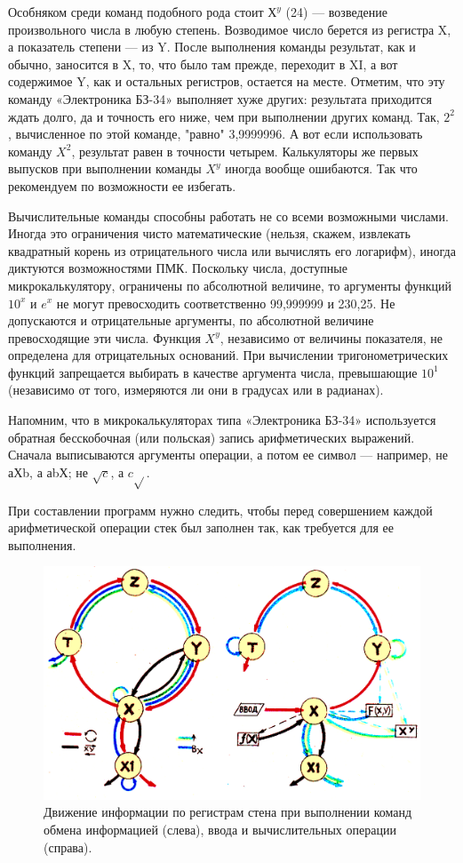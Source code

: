 \documentclass[11pt,a4paper,oneside]{article}
\begin{document}
Особняком среди команд подобного рода стоит $Х^{y}$ (24) — возведение произвольного числа в любую степень. Возводимое число берется из регистра X, а показатель степени — из Y. После выполнения команды результат, как и обычно, заносится в X, то, что было там прежде, переходит в XI, а вот содержимое Y, как и остальных регистров, остается на месте. Отметим, что эту команду «Электроника БЗ-34» выполняет хуже других: результата приходится ждать долго, да и точность его ниже, чем при выполнении других команд. Так, $2^{2}$, вычисленное по этой команде, "равно" 3,9999996. А вот если использовать команду $X^{2}$, результат равен в точности четырем. Калькуляторы же первых выпусков при выполнении команды $X^{y}$ иногда вообще ошибаются. Так что рекомендуем по возможности ее избегать.

Вычислительные команды способны работать не со всеми возможными числами. Иногда это ограничения чисто математические (нельзя, скажем, извлекать квадратный корень из отрицательного числа или вычислять его логарифм), иногда диктуются возможностями ПМК. Поскольку числа, доступные микрокалькулятору, ограничены по абсолютной величине, то аргументы функций $10^{x}$ и $e^{x}$ не могут превосходить соответственно 99,999999 и 230,25. Не допускаются и отрицательные аргументы, по абсолютной величине превосходящие эти числа. Функция $X^{y}$, независимо от величины показателя, не определена для отрицательных оснований. При вычислении тригонометрических функций запрещается выбирать в качестве аргумента числа, превышающие $10^{1}$ (независимо от того, измеряются ли они в градусах или в радианах).

Напомним, что в микрокалькуляторах типа «Электроника БЗ-34» используется обратная бесскобочная (или польская) запись арифметических выражений. Сначала выписываются аргументы операции, а потом ее символ — например, не аХb, а аbХ; не $\sqrt{c}$, а $c\sqrt{}$.

При составлении программ нужно следить, чтобы перед совершением каждой арифметической операции стек был заполнен так, как требуется для ее выполнения.

\begin{figure}[H]
\includegraphics[width=\textwidth]{stack}
\caption{Движение информации по регистрам стена при выполнении команд обмена информацией (слева), ввода и вычислительных операции (справа).}
\end{figure}
\end{document}
